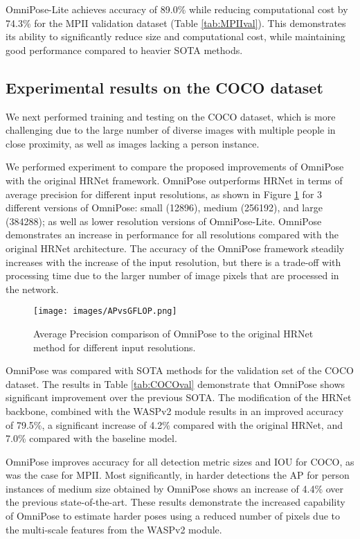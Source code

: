 \documentclass[10pt,twocolumn,letterpaper]{article}
\begin{document}
OmniPose-Lite achieves accuracy of 89.0\% while reducing computational cost by 74.3\% for the MPII validation dataset (Table \ref{tab:MPIIval}).  This  demonstrates its ability to significantly reduce size and computational cost, while maintaining good performance compared to heavier SOTA methods.



\subsection{Experimental results on the COCO dataset}
We next performed training and testing on the COCO dataset, which is more challenging due to the large number of diverse images with multiple people in close proximity, as well as images lacking a person instance.

We performed experiment to compare the proposed improvements of OmniPose with the original HRNet framework.
OmniPose outperforms HRNet in terms of average precision for different input resolutions, as shown in Figure \ref{fig:APvsGFLOP} for 3 different versions of OmniPose: small (12896), medium (256192), and large (384288); as well as lower resolution versions of OmniPose-Lite.
OmniPose demonstrates an increase in performance for all resolutions compared with the original HRNet architecture. The accuracy of the OmniPose framework steadily increases with the increase of the input resolution, but there is a trade-off with processing time due to the larger number of image pixels that are processed in the network.

\begin{figure}[h!]
\begin{center}
\texttt{[image: images/APvsGFLOP.png]}
\end{center}
  \caption{Average Precision comparison of OmniPose to the original HRNet method for different input resolutions.}
\label{fig:APvsGFLOP}
\end{figure}

OmniPose was compared with SOTA methods for the validation set of the COCO dataset. 
The results in Table \ref{tab:COCOval} demonstrate that OmniPose shows significant improvement over the previous SOTA. 
The modification of the HRNet backbone, combined with the WASPv2 module results in an improved accuracy of 79.5\%, a significant increase of 4.2\% compared with the original HRNet, and 7.0\% compared with the baseline model. 


OmniPose improves accuracy for all detection metric sizes and IOU for COCO, as was the case for MPII. Most significantly, in harder detections the AP for person instances of medium size obtained by OmniPose shows an increase of 4.4\% over the previous state-of-the-art.
These results demonstrate the increased capability of OmniPose to estimate harder poses using a reduced number of pixels due to the multi-scale features from the WASPv2 module.
\end{document}
